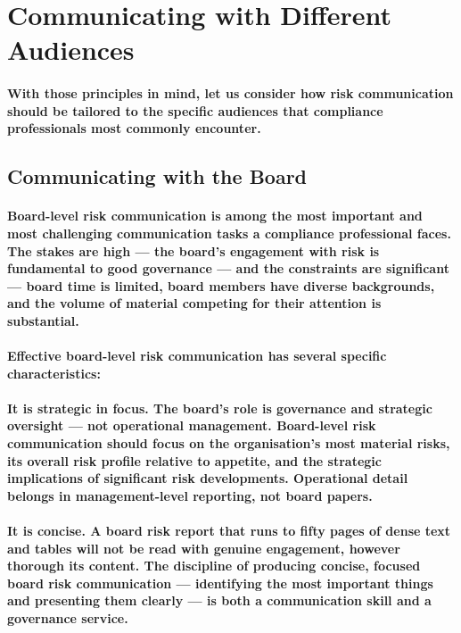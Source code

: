 \section{Communicating with Different Audiences}
\paragraph{With those principles in mind, let us consider how risk communication should be tailored to the specific audiences that compliance professionals most commonly encounter.}

\subsection{Communicating with the Board}
\paragraph{Board-level risk communication is among the most important and most challenging communication tasks a compliance professional faces. The stakes are high — the board's engagement with risk is fundamental to good governance — and the constraints are significant — board time is limited, board members have diverse backgrounds, and the volume of material competing for their attention is substantial.}
\paragraph{Effective board-level risk communication has several specific characteristics:}
\paragraph{\textbf{It is strategic in focus. The board's role is governance and strategic oversight — not operational management. Board-level risk communication should focus on the organisation's most material risks, its overall risk profile relative to appetite, and the strategic implications of significant risk developments. Operational detail belongs in management-level reporting, not board papers.}}
\paragraph{\textbf{It is concise}. A board risk report that runs to fifty pages of dense text and tables will not be read with genuine engagement, however thorough its content. The discipline of producing concise, focused board risk communication — identifying the most important things and presenting them clearly — is both a communication skill and a governance service.}
